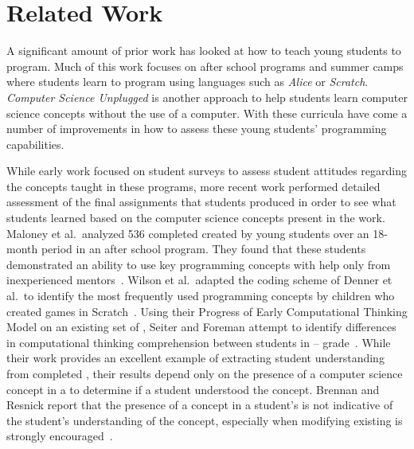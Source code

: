\section{Related Work}
A significant amount of prior work has looked at how to teach young students to
program. Much of this work focuses on after school programs and summer camps
where students learn to program using languages such as \emph{Alice} or
\emph{Scratch}. \emph{Computer Science Unplugged} is another approach to help
students learn computer science concepts without the use of a computer. With
these curricula have come a number of improvements in how to assess these young
students’ programming capabilities.

While early work focused on student surveys to assess student attitudes
regarding the concepts taught in these programs, more recent work performed
detailed assessment of the final assignments that students produced in order to
see what students learned based on the computer science concepts present in the
work. Maloney et al.\ analyzed 536 completed  created by young
students over an 18-month period in an after school program. They found that
these students demonstrated an ability to use key programming concepts with
help only from inexperienced
mentors~\cite{Maloney:2008:PCU:1352135.1352260}. Wilson et al.\ adapted the
coding scheme of Denner et al.\ to identify the most frequently used
programming concepts by children who created games in
Scratch~\cite{Denner:2012:CGC:2072695.2073050, wilson12}. Using their Progress
of Early Computational Thinking Model on an existing set of ,
Seiter and Foreman attempt to identify differences in computational thinking
comprehension between students in --
grade~\cite{Seiter:2013:MLP:2493394.2493403}. While their work provides an
excellent example of extracting student understanding from completed
, their results depend only on the presence of a computer science
concept in a \sprogram{} to determine if a student understood the
concept. Brennan and Resnick report that the presence of a concept in a
student's \sprogram{} is not indicative of the student's understanding of the
concept, especially when modifying existing  is strongly
encouraged~\cite{brennan12}.

